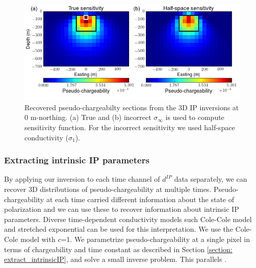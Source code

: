 \documentclass[a4paper, 11pt]{article}
\newcommand{\siginf}{\sigma_\infty}
\newcommand{\dip}{d^{IP}}
\begin{document}
\begin{figure}[htb]
  \centering
  \includegraphics[width=1.\textwidth]{figures/True_vs_approx_sensitivity.png}
  \caption{Recovered pseudo-chargeabilty sections from the 3D IP inversions at 0 m-northing.  (a) True and (b) incorrect $\siginf$ is used to compute sensitivity function. For the incorrect sensitivity we used half-space conductivity ($\sigma_1$).}
  \label{F:True_vs_approx_sensitivity}
\end{figure}
\clearpage

\subsubsection{Extracting intrinsic IP parameters}
By applying our inversion to each time channel of $\dip$ data separately, we can recover 3D distributions of pseudo-chargeability at multiple times. 
Pseudo-chargeability at each time carried different information about the state of polarization and we can use these to recover information about intrinsic IP parameters. 
Diverse time-dependent conductivity models such Cole-Cole model and stretched exponential can be used for this interpretation.
We use the Cole-Cole model with $c$=1. 
We parametrize pseudo-chargeability at a single pixel in terms of chargeability and time constant as described in Section \ref{section: extract_intrinsicIP}, and solve a small inverse problem. This parallels \cite[]{Yuval1997,Hordt2006}.
\end{document}
